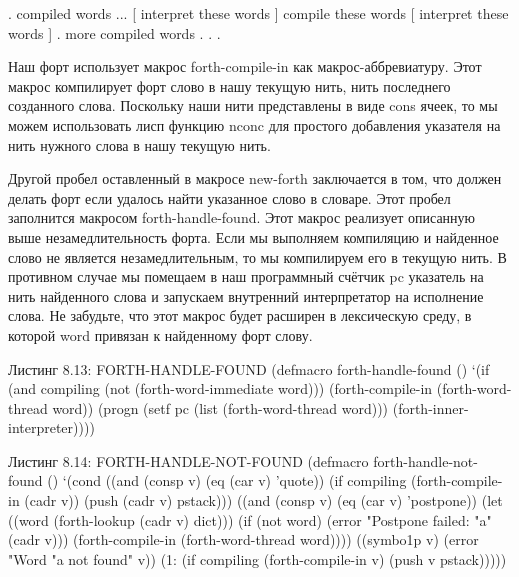 . compiled words ...
[ interpret these words
] compile these words [
interpret these words
]
. more compiled words . . .

Наш форт использует макрос forth-compile-in как макрос-аббревиатуру. Этот макрос компилирует форт слово в нашу текущую нить, нить последнего созданного слова. Поскольку наши нити представлены в виде cons ячеек, то мы можем использовать лисп функцию nconc для простого добавления указателя на нить нужного слова в нашу текущую нить.

Другой пробел оставленный в макросе new-forth заключается в том, что должен делать форт если удалось найти указанное слово в словаре. Этот пробел заполнится макросом forth-handle-found. Этот макрос реализует описанную выше незамедлительность форта. Если мы выполняем компиляцию и найденное слово не является незамедлительным, то мы компилируем его в текущую нить. В противном случае мы помещаем в наш программный счётчик pc указатель на нить найденного слова и запускаем внутренний интерпретатор на исполнение слова. Не забудьте, что этот макрос будет расширен в лексическую среду, в которой word привязан к найденному форт слову.

Листинг 8.13: FORTH-HANDLE-FOUND
(defmacro forth-handle-found ()
‘(if (and compiling
(not (forth-word-immediate word)))
(forth-compile-in (forth-word-thread word))
(progn
(setf pc (list (forth-word-thread word)))
(forth-inner-interpreter))))

Листинг 8.14: FORTH-HANDLE-NOT-FOUND
(defmacro forth-handle-not-found ()
‘(cond
((and (consp v) (eq (car v) ’quote))
(if compiling
(forth-compile-in (cadr v))
(push (cadr v) pstack)))
((and (consp v) (eq (car v) ’postpone))
(let ((word (forth-lookup (cadr v) dict)))
(if (not word)
(error "Postpone failed: "a" (cadr v)))
(forth-compile-in (forth-word-thread word))))
((symbo1p v)
(error "Word "a not found" v))
(1:
(if compiling
(forth-compile-in v)
(push v pstack)))))

